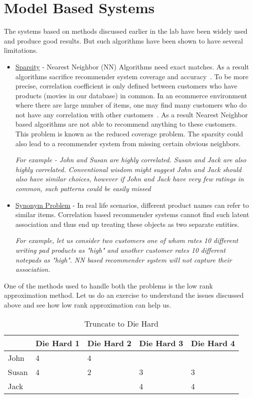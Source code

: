 \section{Model Based Systems}
  The systems based on methods discussed earlier in the lab have been widely used and produce good results. But such algorithms have been shown to have several limitations. 
  \begin{itemize}
    \item \underline{Sparsity} - Nearest Neighbor (NN) Algorithms need exact matches. As a result algorithms sacrifice recommender system coverage and accuracy~\cite{model_ref1}. To be more precise, correlation coefficient is only defined between customers who have products (movies in our database) in common. In an ecommerce environment where there are large number of items, one may find many customers who do not have any correlation with other customers~\cite{model_ref2}. As a result Nearest Neighbor based algorithms are not able to recommend anything to these customers. This problem is known as the reduced coverage problem. The sparsity could also lead to a recommender system from missing certain obvious neighbors. 

\textit{For example - John and Susan are highly correlated. Susan and Jack are also highly correlated. Conventional wisdom might suggest John and Jack should also have similar choices, however if John and Jack have very few ratings in common, such patterns could be easily missed}
    \item \underline{Synonym Problem} - In real life scenarios, different product names can refer to similar items. Correlation based recommender systems cannot find such latent association and thus end up treating these objects as two separate entities. 

\textit{For example, let us consider two customers one of whom rates 10 different writing pad products as "high" and another customer rates 10 different notepads as "high". NN based recommender system will not capture their association.}
  \end{itemize}
  One of the methods used to handle both the problems is the low rank approximation method. Let us do an exercise to understand the issues discussed above and see how low rank approximation can help us. \\
  \begin{table}[]
  \centering
  \label{my-label}
  \begin{tabular}{|l|l|l|l|l|}
  \hline
      & Die Hard 1 & Die Hard 2 & Die Hard 3 & Die Hard 4 \\ \hline
John  & 4          & 4          &            &            \\ \hline
Susan & 4          & 2          & 3          & 3          \\ \hline
Jack  &            &            & 4          & 4          \\ \hline
  \end{tabular}
  \caption{Truncate to Die Hard}
  \label{Model-1}
  \end{table}
